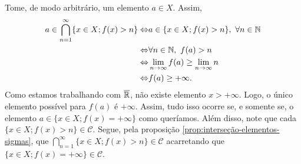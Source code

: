     \begin{prova}
        Tome, de modo arbitrário, um elemento $a \in X$. 
        Assim, 
        \begin{align*}
            a \in \bigcap_{n = 1}^\infty \{x \in X; f(x) > n\} 
            \Leftrightarrow & a \in \{x \in X; f(x) > n\}, \ \forall n \in \N\\
            \Leftrightarrow & \forall n \in \N,\ f(a) > n\\
            \Leftrightarrow & \dlim_{n \to \infty} f(a) \geq \dlim_{n \to \infty} n\\
            \Leftrightarrow & f(a) \geq +\infty.  
        \end{align*}
    Como estamos trabalhando com $\operatorname{\overline{\mathbb{R}}}$, não existe elemento $x > +\infty$.
    Logo, o único elemento possível para $f(a)$ é $+\infty$.
    Assim, tudo isso ocorre se, e somente se, o elemento $a \in \{x \in X; f(x) = +\infty\}$ como queríamos.
    Além disso, note que cada $\{x \in X; f(x) > n\} \in \mathcal{C}$.
    Segue, pela proposição \ref{prop:interseção-elementos-sigmas}, que $\displaystyle \bigcap_{n = 1}^\infty \{x \in X; f(x) > n\} \in \mathcal{C}$ acarretando que $\{x \in X; f(x) = +\infty\} \in \mathcal{C}$. 
    \end{prova}

